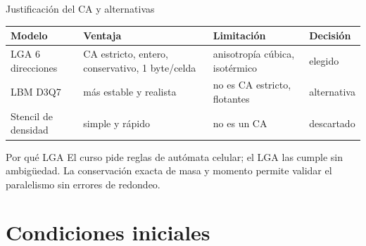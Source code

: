 \documentclass[aspectratio=169]{beamer}
\begin{document}
\begin{frame}{Justificación del CA y alternativas}
  \centering
  \scriptsize
  \begin{tabular}{>{\raggedright\arraybackslash}p{2.6cm}>{\raggedright\arraybackslash}p{3.5cm}>{\raggedright\arraybackslash}p{3.8cm}>{\raggedright\arraybackslash}p{3.2cm}}
    \toprule
    Modelo & Ventaja & Limitación & Decisión \\
    \midrule
    LGA 6 direcciones & CA estricto, entero, conservativo, 1 byte/celda &
    anisotropía cúbica, isotérmico & \alert{elegido} \\
    LBM D3Q7 & más estable y realista & no es CA estricto, flotantes &
    alternativa \\
    Stencil de densidad & simple y rápido & no es un CA &
    descartado \\
    \bottomrule
  \end{tabular}
  \vspace{3mm}
  \begin{block}{Por qué LGA}
    \footnotesize
    El curso pide \alert{reglas de autómata celular}; el LGA las cumple sin
    ambigüedad. La conservación exacta de masa y momento permite validar el
    paralelismo sin errores de redondeo.
  \end{block}
\end{frame}

\section{Condiciones iniciales}
\end{document}
